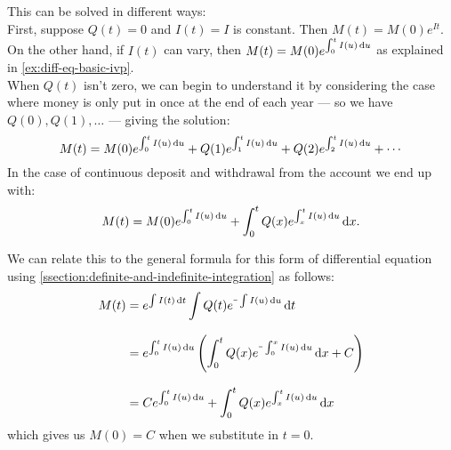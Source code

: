 \documentclass[../MathsNotesBase.tex]{subfiles}
\begin{document}
{\begin{exe}
{				This can be solved in different ways:\\
				
				First, suppose $Q(t)=0$ and $I(t)=I$ is constant. Then ${ M(t)=M(0) e^{I t} }$.\\
				
				On the other hand, if $I(t)$ can vary, then ${ M(t) = M(0) e^{\int_{0}^{t} I(u) \dif u} }$ as explained in \ref{ex:diff-eq-basic-ivp}.\\
				
				When $Q(t)$ isn't zero, we can begin to understand it by considering the case where money is only put in once at the end of each year --- so we have ${ Q(0), Q(1), \dots }$ --- giving the solution:
				\[ M(t) = M(0) e^{\int_{0}^{t} I(u) \dif u} + Q(1) e^{\int_{1}^{t} I(u) \dif u} + Q(2) e^{\int_{2}^{t} I(u) \dif u} + \cdots \]
				In the case of continuous deposit and withdrawal from the account we end up with:
				\[ M(t) = M(0) e^{\int_{0}^{t} I(u) \dif u} + \int_0^t Q(x) e^{\int_x^t I(u) \dif u} \dif x. \]
				
				We can relate this to the general formula for this form of differential equation using \ref{ssection:definite-and-indefinite-integration} as follows:
				\begin{align*}
					M(t) &= e^{\int I(t) \dif t} \int Q(t) e^{\uminus\int I(u) \dif u} \dif t \\[8pt]
					&= e^{\int_0^t I(u) \dif u} \left( \int_0^t Q(x) e^{\uminus\int_0^x I(u) \dif u} \dif x + C \right) \\[8pt]
					&= C e^{\int_0^t I(u) \dif u}  + \int_0^t Q(x) e^{\int_x^t I(u) \dif u} \dif x
				\end{align*}
				which gives us ${ M(0) = C }$ when we substitute in ${ t = 0 }$.
				\biggerskip
			}
		\end{exe}



	
		\pagebreak
		
}
\end{document}
